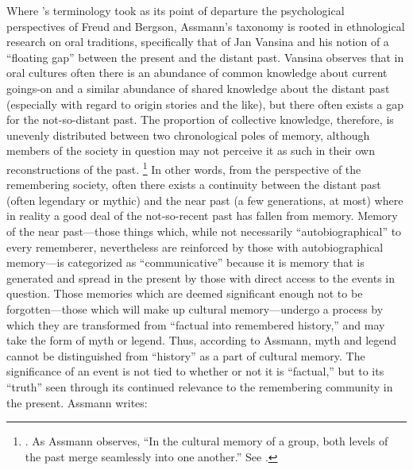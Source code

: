 Where \halbwachs's terminology took as its point of departure the psychological perspectives of Freud%
    \autocite{terdiman_radstone-schwarz2011}
and Bergson,%
    \autocite{ansellpearson_radstone-schwarz2011}
Assmann's taxonomy is rooted in ethnological research on oral traditions, specifically that of Jan Vansina and his notion of a ``floating gap'' between the present and the distant past.%
    \autocite{vansina1985}
Vansina observes that in oral cultures often there is an abundance of common knowledge about current goings-on and a similar abundance of shared knowledge about the distant past (especially with regard to origin stories and the like), but there often exists a gap for the not-so-distant past. The proportion of collective knowledge, therefore, is unevenly distributed between two chronological poles of memory, although members of the society in question may not perceive it as such in their own reconstructions of the past.%
    \footnote{%
        \Cite[23--24]{vansina1985}. 
        As Assmann observes, ``In the cultural memory of a group, both levels of the past merge seamlessly into one another.'' See 
        \cite[35]{assmann2011}.}
In other words, from the perspective of the remembering society, often there exists a continuity between the distant past (often legendary or mythic) and the near past (a few generations, at most) where in reality a good deal of the not-so-recent past has fallen from memory. Memory of the near past---those things which, while not necessarily ``autobiographical'' to every rememberer, nevertheless are reinforced by those with autobiographical memory---is categorized as ``communicative'' because it is memory that is generated and spread in the present by those with direct access to the events in question. Those memories which are deemed significant enough not to be forgotten---those which will make up cultural memory---undergo a process by which they are transformed from ``factual into remembered history,'' and may take the form of myth or legend.%
    \autocite[37--38]{assmann2011}
Thus, according to Assmann, myth and legend cannot be distinguished from ``history'' as a part of cultural memory. The significance of an event is not tied to whether or not it is ``factual,'' but to its ``truth'' seen through its continued relevance to the remembering community in the present.%
    \autocite[Paul Veyne offers a particularly stimulating discussion of the perception of the past and its relationship to myth. He concludes his book with the insightful quote, ``The theme of this book was very simple. Merely by reading the title, anyone with the slightest historical background would immediately have answered, `but of course they believed in their myths!' We have simply wanted also to make clear that what is true of `them' is also true of ourselves and to bring out the implications of this primary truth.''][128--129]{veyne1988}
Assmann writes:  

